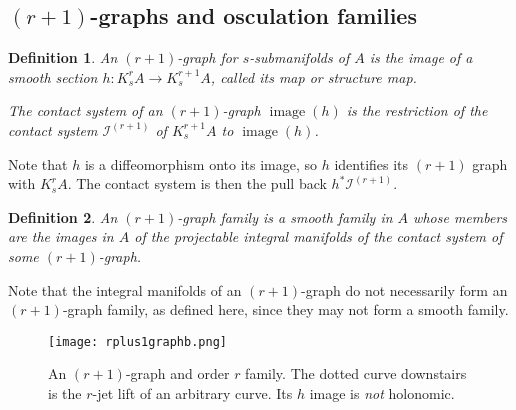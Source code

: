 \documentclass[12pt]{article}
\numberwithin{equation}{section}
\theoremstyle{plain}
\newtheorem{definition}{Definition}[section]
\theoremstyle{definition}
\newcommand{\im}{\operatorname{image}}
\newcommand{\R}{\mathbb{R}}
\newcommand{\ra}{\rightarrow}
\begin{document}

\subsection{$(r+1)$-graphs and osculation families}\label{oscsec}
\begin{definition}
An \emph{$(r+1)$-graph for $s$-submanifolds of $A$} is the image of a smooth section $h:K^{r}_{s}A\ra K^{r+1}_{s}A$, called its \emph{map} or \emph{structure map}.

The \emph{contact system} of an $(r+1)$-graph $\im(h)$ is the restriction of the contact system $\mathcal{I}^{(r+1)}$ of $K^{r+1}_{s}A$ to $\im(h)$.
\end{definition}
Note that $h$ is a diffeomorphism onto its image, so $h$ identifies its $(r+1)$ graph with $K^{r}_{s}A$. The contact system is then the pull back $h^{*}\mathcal{I}^{(r+1)}$.
\begin{definition}
An \emph{$(r+1)$-graph family} is a smooth family in $A$ whose members are the images in $A$ of the projectable integral manifolds of the contact system of some $(r+1)$-graph.
\end{definition}
Note that the integral manifolds of an $(r+1)$-graph do not necessarily form an $(r+1)$-graph family, as defined here, since they may not form a smooth family.

\begin{figure}[H]
 \centering
   \texttt{[image: rplus1graphb.png]}
   \caption{An $(r+1)$-graph and order $r$ family. The dotted curve downstairs is the $r$-jet lift of an arbitrary curve. Its $h$ image is \emph{not} holonomic.}
\end{figure}
\end{document}
